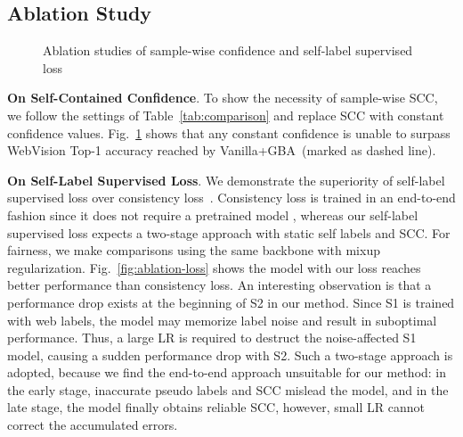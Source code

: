 \documentclass[runningheads]{llncs}
\begin{document}
\subsection{Ablation Study}
\label{S:exp-ablation}


\begin{figure}[b]
\centering
{}
\hfill
{}
	\caption{Ablation studies of sample-wise confidence and self-label supervised loss}
\label{fig:ablation}
\end{figure}

\textbf{On Self-Contained Confidence}.
To show the necessity of sample-wise SCC, we follow the settings of Table~\ref{tab:comparison} and replace SCC with constant confidence values.
Fig.~\ref{fig:ablation} shows that any constant confidence is unable to surpass  WebVision Top-1 accuracy reached by Vanilla+GBA~(marked as dashed line).

\textbf{On Self-Label Supervised Loss}.
We demonstrate the superiority of self-label supervised loss over consistency loss~\cite{berthelot2019mixmatch,xie2019unsupervised}. 
Consistency loss is trained in an end-to-end fashion since it does not require a pretrained model , 
whereas our self-label supervised loss expects a two-stage approach with static self labels and SCC.
For fairness, we make comparisons using the same backbone with mixup regularization. Fig.~\ref{fig:ablation-loss} shows the model with our loss reaches better performance than consistency loss. An interesting observation is that a performance drop exists at the beginning of S2 in our method. 
Since S1 is trained with web labels, the model may memorize label noise and result in suboptimal performance. Thus, a large LR is required to destruct the noise-affected S1 model, causing a sudden performance drop with S2. Such a two-stage approach is adopted, because we find the end-to-end approach unsuitable for our method: in the early stage, inaccurate pseudo labels and SCC mislead the model, and in the late stage, the model finally obtains reliable SCC, however, small LR cannot correct the accumulated errors.
\end{document}
